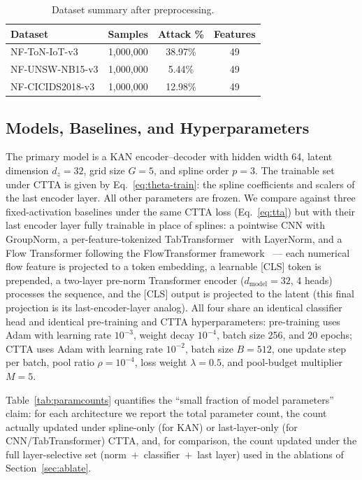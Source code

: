 \documentclass[10pt, conference, letterpaper]{IEEEtran}
\begin{document}
\begin{table}[h]
\centering
\caption{Dataset summary after preprocessing.}
\label{tab:datasets}
\begin{tabular}{lccc}
\toprule
\textbf{Dataset} & \textbf{Samples} & \textbf{Attack \%} & \textbf{Features} \\
\midrule
NF-ToN-IoT-v3    & 1,000,000 & 38.97\% & 49 \\
NF-UNSW-NB15-v3  & 1,000,000 & 5.44\%  & 49 \\
NF-CICIDS2018-v3 & 1,000,000 & 12.98\% & 49 \\
\bottomrule
\end{tabular}
\end{table}

\subsection{Models, Baselines, and Hyperparameters}

The primary model is a KAN encoder--decoder with hidden width 64, latent dimension $d_z = 32$, grid size $G = 5$, and spline order $p = 3$. The trainable set under CTTA is given by Eq.~\eqref{eq:theta-train}: the spline coefficients and scalers of the last encoder layer. All other parameters are frozen. We compare against three fixed-activation baselines under the same CTTA loss (Eq.~\eqref{eq:tta}) but with their last encoder layer fully trainable in place of splines: a pointwise CNN with GroupNorm, a per-feature-tokenized TabTransformer~\cite{huang2020tabtransformer, vaswani2017attention} with LayerNorm, and a Flow Transformer following the FlowTransformer framework~\cite{manocchio2024flowtransformer} --- each numerical flow feature is projected to a token embedding, a learnable [CLS] token is prepended, a two-layer pre-norm Transformer encoder ($d_{\text{model}} = 32$, 4 heads) processes the sequence, and the [CLS] output is projected to the latent (this final projection is its last-encoder-layer analog). All four share an identical classifier head and identical pre-training and CTTA hyperparameters: pre-training uses Adam with learning rate $10^{-3}$, weight decay $10^{-4}$, batch size 256, and 20 epochs; CTTA uses Adam with learning rate $10^{-2}$, batch size $B = 512$, one update step per batch, pool ratio $\rho = 10^{-4}$, loss weight $\lambda = 0.5$, and pool-budget multiplier $M = 5$.

Table~\ref{tab:paramcounts} quantifies the ``small fraction of model parameters'' claim: for each architecture we report the total parameter count, the count actually updated under spline-only (for KAN) or last-layer-only (for CNN/TabTransformer) CTTA, and, for comparison, the count updated under the full layer-selective set (norm~+~classifier~+~last layer) used in the ablations of Section~\ref{sec:ablate}.
\end{document}
